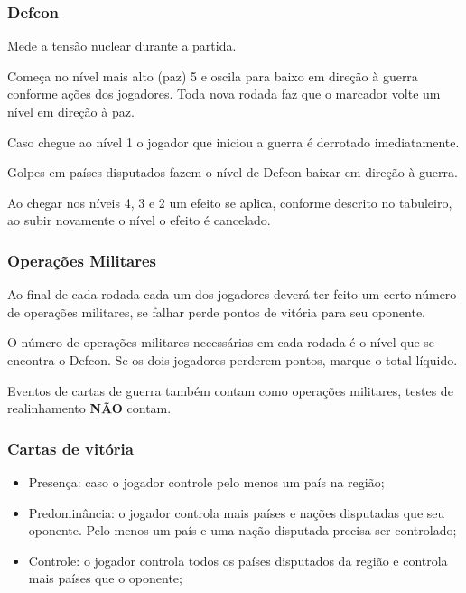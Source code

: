 \documentclass[11pt]{article}
\begin{document}
\subsubsection{Defcon}
\label{sec:org8615db0}

Mede a tensão nuclear durante a partida.

Começa no nível mais alto (paz) 5 e oscila para baixo em direção à guerra conforme ações dos jogadores. Toda nova rodada faz que o marcador volte um nível em direção à paz.

Caso chegue ao nível 1 o jogador que iniciou a guerra é derrotado imediatamente.

Golpes em países disputados fazem o nível de Defcon baixar em direção à guerra.

Ao chegar nos níveis 4, 3 e 2 um efeito se aplica, conforme descrito no tabuleiro, ao subir novamente o nível o efeito é cancelado.

\subsubsection{Operações Militares}
\label{sec:orgcb3d32d}

Ao final de cada rodada cada um dos jogadores deverá ter feito um certo número de operações militares, se falhar perde pontos de vitória para seu oponente.

O número de operações militares necessárias em cada rodada é o nível que se encontra o Defcon. Se os dois jogadores perderem pontos, marque o total líquido.

Eventos de cartas de guerra também contam como operações militares, testes de realinhamento \textbf{NÃO} contam.

\subsubsection{Cartas de vitória}
\label{sec:org7dbf3a5}

\begin{itemize}
\item Presença: caso o jogador controle pelo menos um país na região;

\item Predominância: o jogador controla mais países e nações disputadas que seu oponente. Pelo menos um país e uma nação disputada precisa ser controlado;

\item Controle: o jogador controla todos os países disputados da região e controla mais países que o oponente;
\end{itemize}
\end{document}
